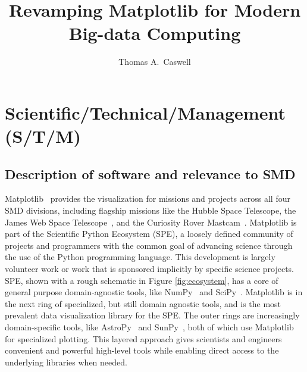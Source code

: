 \documentclass[12pt]{article}
\numberwithin{page}{section}
\begin{document}
\title{Revamping Matplotlib for Modern Big-data Computing}
\author{Thomas A.\ Caswell}
\date{}
\maketitle

\setcounter{tocdepth}{2}
\tableofcontents
\thispagestyle{empty}
\newpage

\section{Scientific/Technical/Management (S/T/M)}
\setcounter{page}{1}

\subsection{Description of software and relevance to SMD}

Matplotlib~\cite{Hunter:2007} provides the visualization for missions and
projects across all four SMD divisions,
including
flagship missions like the Hubble Space Telescope, the James Web Space
Telescope~\cite{jwst_pipeline}, and the Curiosity Rover
Mastcam~\cite{https://doi.org/10.1002/2016EA000219}.  Matplotlib is part of the
Scientific
Python Ecosystem (SPE), a loosely defined community of projects and
programmers with the common goal of advancing science through the use
of the Python programming language.  This development is largely
volunteer work or work that is sponsored implicitly by specific
science projects.  SPE, shown with a rough schematic in Figure
\ref{fig:ecosystem}, has a core of general purpose domain-agnostic
tools, like NumPy~\cite{Harris2020} and SciPy~\cite{Virtanen2020}. Matplotlib
is in the next ring of specialized, but still domain agnostic tools, and is the
most prevalent data visualization
library for the SPE.  The outer rings are increasingly domain-specific tools,
like
AstroPy~\cite{robitaille2013astropy} and
SunPy~\cite{sunpy_community2020}, both of which use Matplotlib for specialized
plotting.  This layered approach gives
scientists and engineers convenient and powerful high-level tools
while enabling direct access to the underlying libraries when needed.
\end{document}
